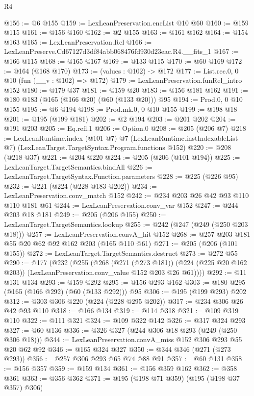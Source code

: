 \begin{lexlean}{R4}
\begin{coremodule}
@156 := @6 @155
@159 := LexLeanPreservation.encList @10 @60
@160 := @159 @115
@161 := @156 @160
@162 := @2 @155
@163 := @161 @162
@164 := @154 @163
@165 := LexLeanPreservation.Rel
@166 := LexLeanPreserve.Cd67127d3df84abb068476fd930d23eac.R4.__fits_1
@167 := @166 @115
@168 := @165 @167
@169 := @133 @115
@170 := @60 @169
@172 := @164 (@168 @170)
@173 := (values : @102) -> @172
@177 := List.rec.{0, 0} @10 (fun (__v : @102) => @172)
@179 := LexLeanPreservation.funRel_intro @152
@180 := @179 @37
@181 := @159 @20
@183 := @156 @181 @162
@191 := @180 @183 (@165 (@166 @20) (@60 (@133 @20))) @95
@194 := Prod.{0, 0} @10 @155
@195 := @6 @194
@198 := Prod.mk.{0, 0} @10 @155
@199 := @198 @18
@201 := @195 (@199 @181)
@202 := @2 @194
@203 := @201 @202
@204 := @191 @203
@205 := Eq.refl.{1}
@206 := Option.{0}
@208 := @205 (@206 @7)
@218 := LexLeanRuntime.index
    (@101 @7)
    @7
    (LexLeanRuntime.instIndexableList @7)
    (LexLeanTarget.TargetSyntax.Program.functions @152)
@220 := @208 (@218 @37)
@221 := @204 @220
@224 := @205 (@206 (@101 @194))
@225 := LexLeanTarget.TargetSemantics.bindAll
@226 := LexLeanTarget.TargetSyntax.Function.parameters
@228 := @225 (@226 @95)
@232 := @221 (@224 (@228 @183 @202))
@234 := LexLeanPreservation.conv_match @152
@242 := @234 @203 @26 @42 @93 @110 @110 @181 @61
@244 := LexLeanPreservation.conv_var @152
@247 := @244 @203 @18 @181
@249 := @205 (@206 @155)
@250 := LexLeanTarget.TargetSemantics.lookup
@255 := @242 (@247 (@249 (@250 @203 @18)))
@257 := LexLeanPreservation.convA_hit @152
@268 := @257 @203 @181 @55 @20 @62 @92 @162 @203 (@165 @110 @61)
@271 := @205 (@206 (@101 @155))
@272 := LexLeanTarget.TargetSemantics.destruct
@273 := @272 @55
@290 := @177
    (@232
      (@255
        (@268
          (@271 (@273 @181))
          (@224 (@225 @20 @162 @203))
          (LexLeanPreservation.conv_value @152 @203 @26 @61))))
@292 := @11 @131 @134
@293 := @159 @292
@295 := @156 @293 @162
@303 := @180 @295 (@165 (@166 @292) (@60 (@133 @292))) @95
@306 := @195 (@199 @293) @202
@312 := @303 @306 @220 (@224 (@228 @295 @202))
@317 := @234 @306 @26 @42 @93 @110
@318 := @166 @134
@319 := @114 @318
@321 := @109 @319 @110
@322 := @111 @321
@324 := @109 @322 @142
@326 := @317 @324 @293
@327 := @60 @136
@336 := @326 @327 (@244 @306 @18 @293 (@249 (@250 @306 @18)))
@344 := LexLeanPreservation.convA_miss @152 @306 @293 @55 @20 @62 @92
@346 := @165 @324 @327
@350 := @344 @346 (@271 (@273 @293))
@356 := @257 @306 @293 @65 @74 @88 @91
@357 := @60 @131
@358 := @156 @357
@359 := @159 @134
@361 := @156 @359 @162
@362 := @358 @361
@363 := @356 @362
@371 := @195 (@198 @71 @359) (@195 (@198 @37 @357) @306)

\end{coremodule}
\end{lexlean}

